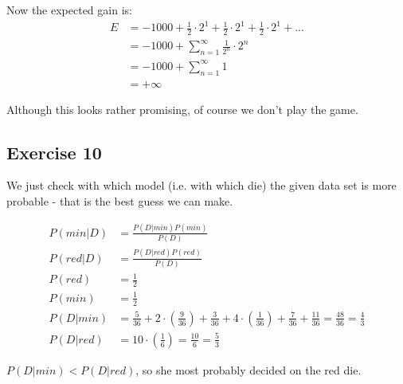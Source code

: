 Now the expected gain is:
\begin{align*}
E &= -1000 + \frac{1}{2} \cdot 2^1 + \frac{1}{2} \cdot 2^1 + \frac{1}{2} \cdot 2^1 + ... \\
  &= -1000 + \sum\limits_{n=1}^\infty \frac{1}{2^n} \cdot 2^n \\
  &= -1000 + \sum\limits_{n=1}^\infty 1 \\
  &= +\infty
\end{align*}

Although this looks rather promising, of course we don't play the game.

\subsection*{Exercise 10}
We just check with which model (i.e. with which die) the given data set is more probable - that is the best guess we can make.

\begin{align*}
P(min|D) &= \frac{P(D|min)P(min)}{P(D)} \\
P(red|D) &= \frac{P(D|red)P(red)}{P(D)} \\
P(red)   &= \frac{1}{2}  \\
P(min)   &= \frac{1}{2}  \\
P(D|min) &= \frac{5}{36} 
      + 2 \cdot \left(\frac{9}{36}\right)
      + \frac{3}{36}
      + 4 \cdot \left( \frac{1}{36} \right)
      + \frac{7}{36}
      + \frac{11}{36}
      = \frac{48}{36} = \frac{4}{3} \\
P(D|red) &= 10 \cdot \left(\frac{1}{6}\right) = \frac{10}{6} = \frac{5}{3}
\end{align*}

$P(D|min) < P(D|red)$, so she most probably decided on the red die.
